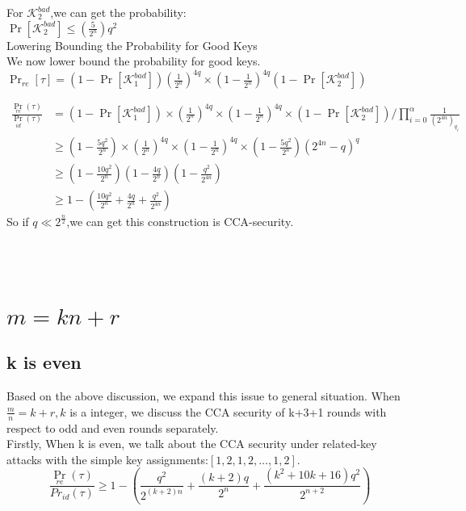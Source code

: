 For $\mathcal{K}_{2}^{bad}$,we can get the probability:\\
$\Pr[\mathcal{K}_{2}^{bad}]\leq (\frac{5}{2^{n}})q^{2}$\\
Lowering Bounding the Probability for Good Keys\\
We now lower bound the probability for good keys.\\
$\Pr_{re}[\tau]=(1-\Pr[\mathcal{K}_{1}^{bad}])(\frac{1}{2^{n}})^{4q}\times(1-\frac{1}{2^{n}})^{4q}
(1-\Pr[\mathcal{K}_{2}^{bad}])$

\begin{align*}
\frac{\Pr_{re}(\tau)}{\Pr_{id}(\tau)}&= (1-\Pr[\mathcal{K}_{1}^{bad}])\times(\frac{1}{2^{n}})^{4q}\times(1-\frac{1}{2^{n}})^{4q}\times
(1-\Pr[\mathcal{K}_{2}^{bad}]) / \prod_{i=0}^{\alpha}\frac{1}{(2^{4n})_{q_{i}}}\\
&\geq (1-\frac{5q^{2}}{2^{n}})\times(\frac{1}{2^{n}})^{4q}\times(1-\frac{1}{2^{n}})^{4q}\times
(1-\frac{5q^{2}}{2^{n}})(2^{4n}-q)^{q}\\
&\geq(1-\frac{10q^{2}}{2^{n}})(1-\frac{4q}{2^{n}})(1-\frac{q^{2}}{2^{4n}})\\
&\geq 1-( \frac{10q^{2}}{2^{n}}+\frac{4q}{2^{n}} +\frac{q^{2}}{2^{4n}})
\end{align*}
So if $q \ll 2^{\frac{n}{2}}$,we can get this construction is CCA-security.\\
\\
\\
\\

\section{$m=kn+r$}

\subsection{k is even}
Based on the above discussion, we expand this issue to general situation. When $\frac{m}{n}=k+r, k$ is a integer, we discuss the CCA security of k+3+1 rounds with respect to odd and even rounds separately.\\

Firstly, When k is even, we talk about the CCA security under related-key attacks with the simple key assignments:$[1,2,1,2,\dots,1,2]$.\\

\begin{equation}
\frac{\Pr_{re}(\tau)}{Pr_{id}(\tau)}\geq 1-( \frac{q^{2}}{2^{(k+2)n}}+\frac{(k+2)q}{2^{n}} +\frac{(k^{2}+10k+16)q^{2}}{2^{n+2}})
\end{equation}

